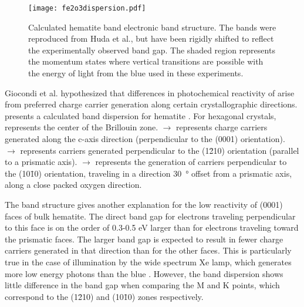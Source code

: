 \begin{figure}
\begin{center}
\texttt{[image: fe2o3dispersion.pdf]}
\caption[Calculated hematite band electronic band structure]{%
	Calculated hematite band electronic band structure. The bands were reproduced from Huda et al.,\cite{Huda:2010kx} but have been rigidly shifted to reflect the experimentally observed band gap. The shaded region represents the momentum states where vertical transitions are possible with the energy of light from the blue  used in these experiments.}
\label{fig:fe2o3dispersion}
\end{center}
\end{figure}
Giocondi et al.\cite{Giocondi:2007fa} hypothesized that differences in photochemical reactivity of  arise from preferred charge carrier generation along certain crystallographic directions.  presents a calculated band dispersion for hematite . For hexagonal crystals, {\textGamma} represents the center of the Brillouin zone. \textGamma$\rightarrow${\textAlpha} represents charge carriers generated along the c-axis direction (perpendicular to the (0001) orientation). \textGamma$\rightarrow${\textMu} represents carriers generated perpendicular to the (1\={2}10) orientation (parallel to a prismatic axis). \textGamma$\rightarrow${\textKappa} represents the generation of carriers perpendicular to the (10\={1}0) orientation, traveling in a direction \SI{30}{\degree} offset from a prismatic axis, along a close packed oxygen direction.

The band structure gives another explanation for the low reactivity of (0001) faces of bulk hematite. The direct band gap for electrons traveling perpendicular to this face is on the order of 0.3-0.5 \si{\electronvolt} larger than for electrons traveling toward the prismatic faces. The larger band gap is expected to result in fewer charge carriers generated in that direction than for the other faces. This is particularly true in the case of illumination by the wide spectrum Xe lamp, which generates more low energy photons than the blue . However, the band dispersion shows little difference in the band gap when comparing the M and K points, which correspond to the (1\={2}10) and (10\={1}0) zones respectively.



